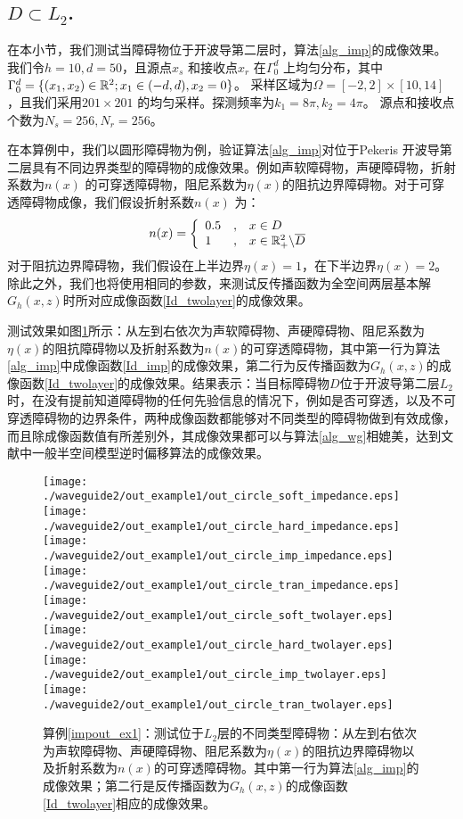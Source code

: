 \subsection{$D\subset L_2$.}
在本小节，我们测试当障碍物位于开波导第二层时，算法\ref{alg_imp}的成像效果。我们令$h=10,d=50$，且源点$x_s$ 和接收点$x_r$ 在$\Gamma_0^d$ 上均匀分布，其中$\Gamma_0^d=\{(x_1,x_2)\in\mathbb{R}^2;x_1\in(-d,d),x_2=0\}$。 采样区域为$\Omega=[-2,2]\times[10,14]$，且我们采用$201\times201$ 的均匀采样。探测频率为$k_1=8\pi,k_2=4\pi$。 源点和接收点个数为$N_s=256,N_r=256$。
\begin{example}[不同边界类型]\label{impout_ex1}
在本算例中，我们以圆形障碍物为例，验证算法\ref{alg_imp}对位于Pekeris 开波导第二层具有不同边界类型的障碍物的成像效果。例如声软障碍物，声硬障碍物，折射系数为$n(x)$ 的可穿透障碍物，阻尼系数为$\eta(x)$的阻抗边界障碍物。对于可穿透障碍物成像，我们假设折射系数$n(x)$ 为：
\begin{eqnarray*}
n(x)=\left\{
\begin{array}{lll}
  0.5&,&x\in D\\
  1&,&x\in\mathbb{R}_+^2\backslash\overline D
\end{array}
\right.
\end{eqnarray*}
对于阻抗边界障碍物，我们假设在上半边界$\eta(x)=1$，在下半边界$\eta(x)=2$。除此之外，我们也将使用相同的参数，来测试反传播函数为全空间两层基本解$G_h(x,z)$时所对应成像函数\ref{Id_twolayer}的成像效果。

测试效果如图\ref{fig_impout_ex1}所示：从左到右依次为声软障碍物、声硬障碍物、阻尼系数为$\eta(x)$的阻抗障碍物以及折射系数为$n(x)$的可穿透障碍物，其中第一行为算法\ref{alg_imp}中成像函数\ref{Id_imp}的成像效果，第二行为反传播函数为$G_h(x,z)$的成像函数\ref{Id_twolayer}的成像效果。结果表示：当目标障碍物$D$位于开波导第二层$L_2$时，在没有提前知道障碍物的任何先验信息的情况下，例如是否可穿透，以及不可穿透障碍物的边界条件，两种成像函数都能够对不同类型的障碍物做到有效成像，而且除成像函数值有所差别外，其成像效果都可以与算法\ref{alg_wg}相媲美，达到文献\cite{ch_ha}中一般半空间模型逆时偏移算法的成像效果。
\end{example}
\begin{figure}[h]
  \centering
  \texttt{[image: ./waveguide2/out\_example1/out\_circle\_soft\_impedance.eps]}
  \texttt{[image: ./waveguide2/out\_example1/out\_circle\_hard\_impedance.eps]}
  \texttt{[image: ./waveguide2/out\_example1/out\_circle\_imp\_impedance.eps]}
  \texttt{[image: ./waveguide2/out\_example1/out\_circle\_tran\_impedance.eps]}
  \texttt{[image: ./waveguide2/out\_example1/out\_circle\_soft\_twolayer.eps]}
  \texttt{[image: ./waveguide2/out\_example1/out\_circle\_hard\_twolayer.eps]}
  \texttt{[image: ./waveguide2/out\_example1/out\_circle\_imp\_twolayer.eps]}
  \texttt{[image: ./waveguide2/out\_example1/out\_circle\_tran\_twolayer.eps]}
  \caption{算例\ref{impout_ex1}：测试位于$L_2$层的不同类型障碍物：从左到右依次为声软障碍物、声硬障碍物、阻尼系数为$\eta(x)$的阻抗边界障碍物以及折射系数为$n(x)$的可穿透障碍物。其中第一行为算法\ref{alg_imp}的成像效果；第二行是反传播函数为$G_h(x,z)$的成像函数\ref{Id_twolayer}相应的成像效果。}
  \label{fig_impout_ex1}
\end{figure}
